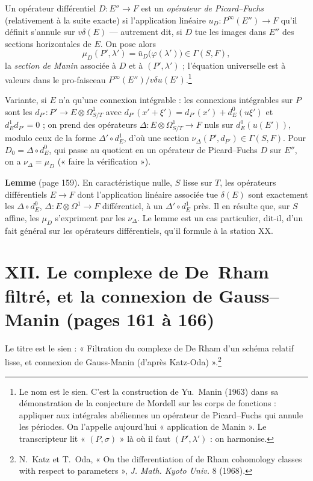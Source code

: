 \documentclass[11pt,a4paper]{article}
\begin{document}
Un opérateur différentiel $D : E'' \to F$ est un \emph{opérateur de
Picard--Fuchs} (relativement à la suite exacte) si l'application linéaire
$u_D : P^\infty(E'') \to F$ qu'il définit s'annule sur $v\delta(E)$ —
autrement dit, si $D$ tue les images dans $E''$ des sections horizontales de
$E$. On pose alors
\[
  \mu_D(P', \lambda') = \bar u_D\bigl(\varphi(\lambda')\bigr) \in \Gamma(S, F),
\]
la \emph{section de Manin} associée à $D$ et à $(P', \lambda')$ ; l'équation
universelle est à valeurs dans le pro-faisceau
$P^\infty(E'')/v\delta u(E')$.\footnote{Le nom est le sien. C'est la
construction de Yu.~Manin (1963) dans sa démonstration de la conjecture de
Mordell sur les corps de fonctions : appliquer aux intégrales abéliennes un
opérateur de Picard--Fuchs qui annule les périodes. On l'appelle aujourd'hui
« application de Manin ». Le transcripteur lit « $(P,\sigma)$ » là où il faut
$(P',\lambda')$ : on harmonise.}

Variante, si $E$ n'a qu'une connexion intégrable : les connexions intégrables
sur $P$ sont les $d_{P'} : P' \to E \otimes \Omega^1_{S/T}$ avec $d_{P'}(x' +
\xi') = d_{P'}(x') + d^0_E(u\xi')$ et $d^1_E d_{P'} = 0$ ; on prend des
opérateurs $\Delta : E \otimes \Omega^1_{S/T} \to F$ nuls sur $d^0_E(u(E'))$,
modulo ceux de la forme $\Delta' \circ d^1_E$, d'où une section
$\nu_\Delta(P', d_{P'}) \in \Gamma(S,F)$. Pour $D_0 = \Delta \circ d^0_E$, qui
passe au quotient en un opérateur de Picard--Fuchs $D$ sur $E''$, on a
$\nu_\Delta = \mu_D$ (« faire la vérification »).

\textbf{Lemme} (page 159). En caractéristique nulle, $S$ lisse sur $T$, les
opérateurs différentiels $E \to F$ dont l'application linéaire associée tue
$\delta(E)$ sont exactement les $\Delta \circ d^0_E$, $\Delta : E \otimes
\Omega^1 \to F$ différentiel, à un $\Delta' \circ d^1_E$ près. Il en résulte
que, sur $S$ affine, les $\mu_D$ s'expriment par les $\nu_\Delta$. Le lemme
est un cas particulier, dit-il, d'un fait général sur les opérateurs
différentiels, qu'il formule à la station XX.

\section*{XII. Le complexe de De~Rham filtré, et la connexion de Gauss--Manin (pages 161 à 166)}

Le titre est le sien : « Filtration du complexe de De Rham d'un schéma
relatif lisse, et connexion de Gauss-Manin (d'après Katz-Oda) ».\footnote{N.~Katz
et T.~Oda, « On the differentiation of de Rham cohomology classes with
respect to parameters », \emph{J. Math. Kyoto Univ.} 8 (1968).}
\end{document}
